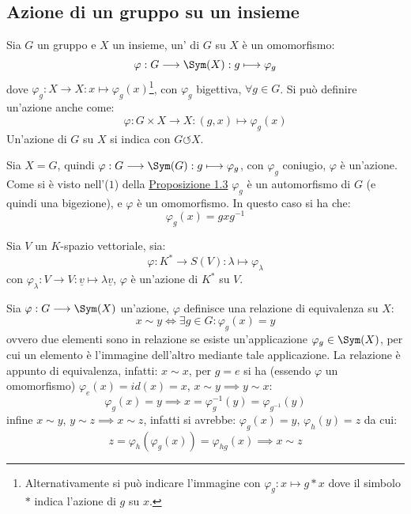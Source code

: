 \documentclass[11pt]{scrartcl}
\begin{document}
\newpage
\subsection{Azione di un gruppo su un insieme}

\begin{definition}
    Sia $G$ un gruppo e $X$ un insieme, un' di $G$ su $X$ è un omomorfismo:
        \[ \varphi : G \longrightarrow \Sym(X) : g \longmapsto \varphi_g 
            \]
    dove $\varphi_g : X \longrightarrow X : x \longmapsto \varphi_g(x)$\footnote{Alternativamente si può indicare l'immagine con $\varphi_g : x \longmapsto g \ast x$ dove il simbolo $\ast$ indica l'azione di $g$ su $x$.},
     con $\varphi_g$ bigettiva, $\forall g \in G$. Si può definire un'azione anche come:
        \[ \varphi : G \times X \longrightarrow X : (g,x) \longmapsto \varphi_g(x)
            \]
    Un'azione di $G$ su $X$ si indica con $G \circlearrowleft X$.
\end{definition}

\begin{example}
    Sia $X = G$, quindi $\varphi : G \longrightarrow \Sym(G) : g \longmapsto \varphi_g$, con $\varphi_g$ coniugio, $\varphi$ è un'azione. Come si è visto nell'($1$)
    della \hyperref[prop1]{Proposizione 1.3} $\varphi_g$ è un automorfismo di $G$ (e quindi una bigezione), e $\varphi$ è un omomorfismo. In questo caso si ha che:
        \[ \varphi_g(x) = gxg^{-1}
            \]
\end{example}

\begin{example}
    Sia $V$ un $K$-spazio vettoriale, sia:
        \[ \varphi : K^* \longrightarrow S(V) : \lambda \longmapsto \varphi_\lambda
            \]
    con $\varphi_\lambda : V \longrightarrow V : \underline v \longmapsto \lambda \underline v$, $\varphi$ è un'azione di $K^*$ su $V$.
\end{example}

Sia $\varphi: G \longrightarrow \Sym(X)$ un'azione, $\varphi$ definisce una relazione di equivalenza su $X$:
    \[ x \sim y \iff \exists g \in G : \varphi_g(x) = y
        \]
    ovvero due elementi sono in relazione se esiste un'applicazione $\varphi_g \in \Sym(X)$, per cui un elemento è l'immagine dell'altro mediante 
    tale applicazione. La relazione è appunto di equivalenza, infatti: $x \sim x$, per $g = e$ si ha (essendo $\varphi$ un omomorfismo) $\varphi_e(x) = id(x) = x$, 
    $x \sim y \implies y \sim x$:
        \[ \varphi_g(x) = y \implies x = \varphi_g^{-1}(y) = \varphi_{g^{-1}}(y)
            \]
    infine $x \sim y$, $y \sim z \implies x \sim z$, infatti si avrebbe: $\varphi_g(x) = y$, $\varphi_h(y) = z$ da cui:
        \[ z = \varphi_h(\varphi_g(x)) = \varphi_{hg}(x) \implies x \sim z
            \]
\end{document}
